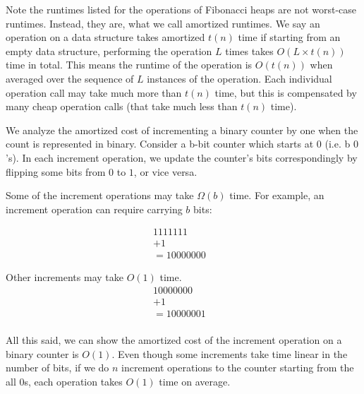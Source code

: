 \documentclass [12pt]{article}
\theoremstyle{definition}
\begin{document}
Note the runtimes listed for the operations of Fibonacci heaps are not worst-case runtimes.
Instead, they are, what we call amortized runtimes. We say an operation on a data structure
takes amortized $t(n)$ time if starting from an empty data structure, performing the operation
$L$ times takes $O(L × t(n))$ time in total. This means the runtime of the operation is $O(t(n))$ when averaged over the sequence of $L$ instances of the operation. Each individual operation
call may take much more than $t(n)$ time, but this is compensated by many cheap operation
calls (that take much less than $t(n)$ time).

We analyze the amortized cost of incrementing a binary counter by one when the count
is represented in binary. Consider a b-bit counter which starts at $0$ (i.e. b $0$'s). In each
increment operation, we update the counter's bits correspondingly by flipping some bits from
$0$ to $1$, or vice versa.

Some of the increment operations may take $\Omega(b)$ time. For example, an increment operation
can require carrying $b$ bits:

\begin{align*}
1111111& \\
+ 1& \\
= 10000000&
\end{align*}

Other increments may take $O(1)$ time. 
\begin{align*}
10000000& \\
+ 1& \\
=10000001& \\
\end{align*}
 
All this said, we can show the amortized cost of the increment operation on a binary counter is $O(1)$. Even though some increments take time linear in the number of bits, if we do $n$ increment operations to the counter starting from the all $0$s, each operation takes $O(1)$ time on average.
\end{document}
